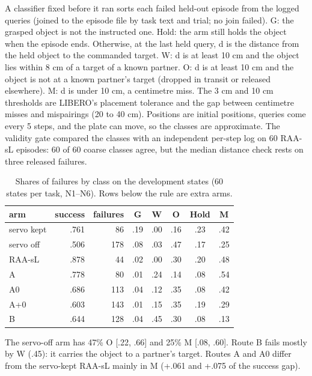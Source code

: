 A classifier fixed before it ran sorts each failed held-out episode from the logged queries (joined to the episode file by task text and trial; no join failed). G: the grasped object is not the instructed one. Hold: the arm still holds the object when the episode ends. Otherwise, at the last held query, d is the distance from the held object to the commanded target. W: d is at least 10 cm and the object lies within 8 cm of a target of a known partner. O: d is at least 10 cm and the object is not at a known partner's target (dropped in transit or released elsewhere). M: d is under 10 cm, a centimetre miss. The 3 cm and 10 cm thresholds are LIBERO's placement tolerance and the gap between centimetre misses and mispairings (20 to 40 cm). Positions are initial positions, queries come every 5 steps, and the plate can move, so the classes are approximate. The validity gate compared the classes with an independent per-step log on 60 RAA-sL episodes: 60 of 60 coarse classes agree, but the median distance check rests on three released failures.

\begin{table}[h]
\caption{Shares of failures by class on the development states (60 states per task, N1--N6). Rows below the rule are extra arms.}
\label{tab:M1}
\centering
\footnotesize
\begin{tabular}{@{}lrrccccc@{}}
\toprule
arm & success & failures & G & W & O & Hold & M \\
\midrule
\pizero{} servo kept & .761 & 86 & .19 & .00 & .16 & .23 & .42 \\
\pizero{} servo off & .506 & 178 & .08 & .03 & .47 & .17 & .25 \\
RAA-sL & .878 & 44 & .02 & .00 & .30 & .20 & .48 \\
A & .778 & 80 & .01 & .24 & .14 & .08 & .54 \\
A0 & .686 & 113 & .04 & .12 & .35 & .08 & .42 \\
\midrule
A+0 & .603 & 143 & .01 & .15 & .35 & .19 & .29 \\
B & .644 & 128 & .04 & .45 & .30 & .08 & .13 \\
\bottomrule
\end{tabular}
\end{table}

The \pizero{} servo-off arm has 47\% O [.22, .66] and 25\% M [.08, .60]. Route B fails mostly by W (.45): it carries the object to a partner's target. Routes A and A0 differ from the servo-kept RAA-sL mainly in M (+.061 and +.075 of the success gap).

